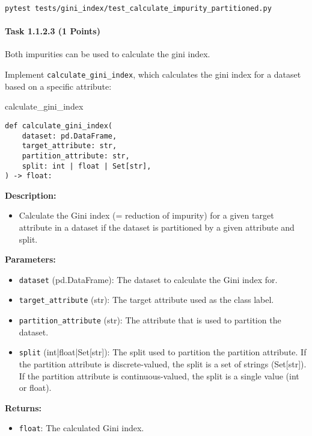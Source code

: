\documentclass[
english,
smallborders
]{i6prcsht}
\newcommand{\points}[1]{\hfill \color{red}(#1 Points)\color{black}}
\begin{document}
\vspace*{0.3cm}

\begin{lstlisting}
pytest tests/gini_index/test_calculate_impurity_partitioned.py
\end{lstlisting}

\newpage

\paragraph*{Task 1.1.2.3 \points{1}} \hfill

Both impurities can be used to calculate the gini index.

Implement \texttt{calculate\_gini\_index}, which calculates the gini index for a dataset based on a specific attribute:

\vspace*{0.3cm}

\begin{functionbox}{calculate\_gini\_index}
	\begin{lstlisting}[numbers=none]
def calculate_gini_index(
    dataset: pd.DataFrame, 
    target_attribute: str,
    partition_attribute: str, 
    split: int | float | Set[str],
) -> float:
\end{lstlisting}
	
	\textbf{Description:}
	\begin{itemize}[leftmargin=*,topsep=0pt]
		\item Calculate the Gini index (= reduction of impurity) for a given target attribute in a dataset if the dataset is partitioned by a given attribute and split.
	\end{itemize}
	
	\textbf{Parameters:}
	\begin{itemize}[leftmargin=*,topsep=0pt]
		\item \texttt{dataset} (pd.DataFrame): The dataset to calculate the Gini index for.
		\item \texttt{target\_attribute} (str): The target attribute used as the class label.
		\item \texttt{partition\_attribute} (str): The attribute that is used to partition the dataset.
		\item \texttt{split} (int|float|Set[str]): The split used to partition the partition attribute. If the partition attribute is discrete-valued, the split is a set of strings (Set[str]). If the partition attribute is continuous-valued, the split is a single value (int or float).
	\end{itemize}
	
	\textbf{Returns:}
	\begin{itemize}[leftmargin=*,topsep=0pt]
		\item \texttt{float}: The calculated Gini index.
	\end{itemize}
\end{functionbox}
\end{document}
